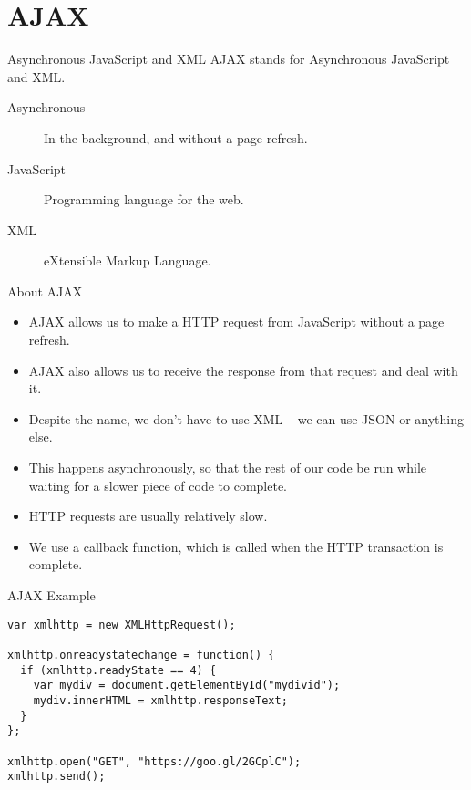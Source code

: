 \section{AJAX}

\begin{frame}{Asynchronous JavaScript and XML}
  AJAX stands for Asynchronous JavaScript and XML.
  \vspace{0.5cm}
  \begin{description}
    \item[Asynchronous] In the background, and without a page refresh.
    \vspace{0.25cm}
    \item[JavaScript] Programming language for the web.
    \vspace{0.25cm}
    \item[XML] eXtensible Markup Language.
  \end{description}
\end{frame}


\begin{frame}{About AJAX}
  \begin{itemize}
    \item AJAX allows us to make a HTTP request from JavaScript without a page refresh.
    \item AJAX also allows us to receive the response from that request and deal with it.
    \item Despite the name, we don't have to use XML -- we can use JSON or anything else.
    \item This happens asynchronously, so that the rest of our code be run while waiting for a slower piece of code to complete.
    \item HTTP requests are usually relatively slow.
    \item We use a callback function, which is called when the HTTP transaction is complete.
  \end{itemize}
\end{frame}

\begin{frame}[fragile]{AJAX Example}
  \begin{verbatim}
var xmlhttp = new XMLHttpRequest();

xmlhttp.onreadystatechange = function() {
  if (xmlhttp.readyState == 4) {
    var mydiv = document.getElementById("mydivid");
    mydiv.innerHTML = xmlhttp.responseText;
  }
};

xmlhttp.open("GET", "https://goo.gl/2GCplC");
xmlhttp.send();
  \end{verbatim}
\end{frame}

